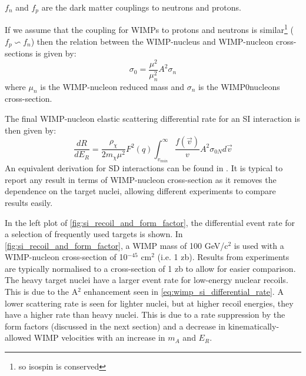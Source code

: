 $f_n$ and $f_p$ are the dark matter couplings to neutrons and protons.
\par
If we assume that the coupling for WIMPs to protons and neutrons is similar\footnote{so isospin is conserved} ($f_p \backsim f_n$) then the relation between the WIMP-nucleus and WIMP-nucleon cross-sections is given by:
\begin{equation}
    \sigma_{0} = \frac{\mu^2}{\mu^2_n}A^2 \sigma_{n}
\end{equation}
where $\mu_n$ is the WIMP-nucleon reduced mass and $\sigma_n$ is the WIMP0nucleons cross-section.
\par
The final WIMP-nucleon elastic scattering differential rate for an SI interaction is then given by:
\begin{equation}
    \frac{dR}{dE_R} = \frac{\rho_\chi}{2 m_\chi \mu^2} F^2(q) \int^{\infty}_{v_{min}} \frac{f(\vec{v})}{v} A^2 \sigma_{0N} d\vec{v}
    \label{eq:wimp_si_differential_rate}
\end{equation}
An equivalent derivation for SD interactions can be found in \cite{wimp_theory_ref}.
It is typical to report any result in terms of WIMP-nucleon cross-section as it removes the dependence on the target nuclei, allowing different experiments to compare results easily.

\par
In the left plot of \autoref{fig:si_recoil_and_form_factor}, the differential event rate for a selection of frequently used targets is shown.
In \autoref{fig:si_recoil_and_form_factor}, a WIMP mass of 100 GeV/c$^2$ is used with a WIMP-nucleon cross-section of 10$^{-45}$ cm$^2$ (i.e. 1 zb).
Results from experiments are typically normalised to a cross-section of 1 zb to allow for easier comparison.
The heavy target nuclei have a larger event rate for low-energy nuclear recoils.
This is due to the A$^2$ enhancement seen in \autoref{eq:wimp_si_differential_rate}.
A lower scattering rate is seen for lighter nuclei, but at higher recoil energies, they have a higher rate than heavy nuclei.
This is due to a rate suppression by the form factors (discussed in the next section) and a decrease in kinematically-allowed WIMP velocities with an increase in $m_A$ and $E_R$.

